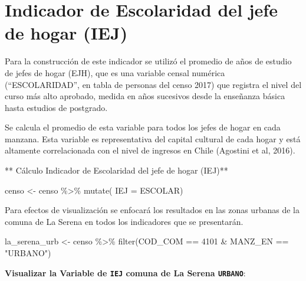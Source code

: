\documentclass[
  letterpaper,
  DIV=11,
  numbers=noendperiod]{scrreprt}
\newenvironment{Shaded}{\begin{snugshade}}{\end{snugshade}}
\newcommand{\AttributeTok}[1]{\textcolor[rgb]{0.40,0.45,0.13}{#1}}
\newcommand{\DecValTok}[1]{\textcolor[rgb]{0.68,0.00,0.00}{#1}}
\newcommand{\FunctionTok}[1]{\textcolor[rgb]{0.28,0.35,0.67}{#1}}
\newcommand{\NormalTok}[1]{\textcolor[rgb]{0.00,0.23,0.31}{#1}}
\newcommand{\OtherTok}[1]{\textcolor[rgb]{0.00,0.23,0.31}{#1}}
\newcommand{\SpecialCharTok}[1]{\textcolor[rgb]{0.37,0.37,0.37}{#1}}
\newcommand{\StringTok}[1]{\textcolor[rgb]{0.13,0.47,0.30}{#1}}
\begin{document}
\hypertarget{indicador-de-escolaridad-del-jefe-de-hogar-iej}{%
\section{Indicador de Escolaridad del jefe de hogar
(IEJ)}\label{indicador-de-escolaridad-del-jefe-de-hogar-iej}}

Para la construcción de este indicador se utilizó el promedio de años de
estudio de jefes de hogar (EJH), que es una variable censal numérica
(``ESCOLARIDAD'', en tabla de personas del censo 2017) que registra el
nivel del curso más alto aprobado, medida en años sucesivos desde la
enseñanza básica hasta estudios de postgrado.

Se calcula el promedio de esta variable para todos los jefes de hogar en
cada manzana. Esta variable es representativa del capital cultural de
cada hogar y está altamente correlacionada con el nivel de ingresos en
Chile (Agostini et al, 2016).

** Cálculo Indicador de Escolaridad del jefe de hogar (IEJ)**

\begin{Shaded}
\begin{Highlighting}[]
\NormalTok{censo }\OtherTok{\textless{}{-}}\NormalTok{ censo }\SpecialCharTok{\%\textgreater{}\%} \FunctionTok{mutate}\NormalTok{( }\AttributeTok{IEJ =}\NormalTok{ ESCOLAR)}
\end{Highlighting}
\end{Shaded}

Para efectos de visualización se enfocará los resultados en las zonas
urbanas de la comuna de La Serena en todos los indicadores que se
presentarán.

\begin{Shaded}
\begin{Highlighting}[]
\NormalTok{la\_serena\_urb }\OtherTok{\textless{}{-}}\NormalTok{ censo }\SpecialCharTok{\%\textgreater{}\%} \FunctionTok{filter}\NormalTok{(COD\_COM }\SpecialCharTok{==} \DecValTok{4101} \SpecialCharTok{\&}\NormalTok{ MANZ\_EN }\SpecialCharTok{==} \StringTok{"URBANO"}\NormalTok{)}
\end{Highlighting}
\end{Shaded}

\textbf{Visualizar la Variable de \texttt{IEJ} comuna de La Serena
\texttt{URBANO}}:
\end{document}
